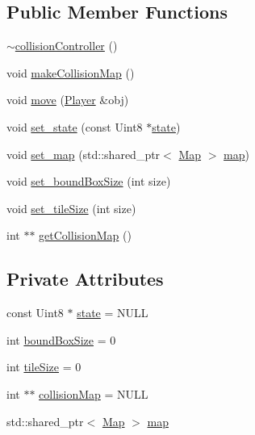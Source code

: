 \subsection*{Public Member Functions}
\begin{DoxyCompactItemize}
\item 
\hyperlink{classcollisionController_a602c73073a3f2f44a8dc65952113f5de}{$\sim$collision\+Controller} ()
\item 
void \hyperlink{classcollisionController_aac25970400c5d905dbf60e69da3720c5}{make\+Collision\+Map} ()
\item 
void \hyperlink{classcollisionController_ad08a8b7f1bc6f803a8875a89ac194bba}{move} (\hyperlink{classPlayer}{Player} \&obj)
\item 
void \hyperlink{classcollisionController_ab92231229dbb6786429137147b4d232b}{set\+\_\+state} (const Uint8 $\ast$\hyperlink{classcollisionController_a5957b53016d027965bf98cf391df28cb}{state})
\item 
void \hyperlink{classcollisionController_aee7db17044f602c0b8a553012540480b}{set\+\_\+map} (std\+::shared\+\_\+ptr$<$ \hyperlink{classMap}{Map} $>$ \hyperlink{classcollisionController_a9624b45dd5e3ba5317291f96e68dcf76}{map})
\item 
void \hyperlink{classcollisionController_a0b59127f63d5caeeb5fa3c573853c8e7}{set\+\_\+bound\+Box\+Size} (int size)
\item 
void \hyperlink{classcollisionController_a025770daba1c75e9479c2375a6543edf}{set\+\_\+tile\+Size} (int size)
\item 
int $\ast$$\ast$ \hyperlink{classcollisionController_adcba90a401d69ebeb270ae0b92b9c335}{get\+Collision\+Map} ()
\end{DoxyCompactItemize}
\subsection*{Private Attributes}
\begin{DoxyCompactItemize}
\item 
const Uint8 $\ast$ \hyperlink{classcollisionController_a5957b53016d027965bf98cf391df28cb}{state} = N\+U\+LL
\item 
int \hyperlink{classcollisionController_a6624f68ec989fb6cce2a6b9f46c15dc3}{bound\+Box\+Size} = 0
\item 
int \hyperlink{classcollisionController_a9a844a9c3873ea03ec04dd382040167c}{tile\+Size} = 0
\item 
int $\ast$$\ast$ \hyperlink{classcollisionController_a71bbc836de2531fa217d46f37f501e71}{collision\+Map} = N\+U\+LL
\item 
std\+::shared\+\_\+ptr$<$ \hyperlink{classMap}{Map} $>$ \hyperlink{classcollisionController_a9624b45dd5e3ba5317291f96e68dcf76}{map}
\end{DoxyCompactItemize}


